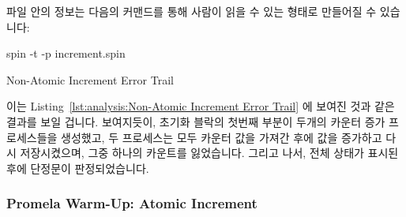  파일 안의 정보는 다음의 커맨드를 통해 사람이 읽을 수 있는 형태로
만들어질 수 있습니다:
\iffalse

This will produce output as shown in
Listing~\ref{lst:formal:Non-Atomic Increment Spin Output}.
The first line tells us that our assertion was violated (as expected
given the non-atomic increment!).
The second line tells us that a \co{trail} file was written describing how the
assertion was violated.
The ``Warning'' line reiterates that all was not well with our model.
The second paragraph describes the type of state-search being carried out,
in this case for assertion violations and invalid end states.
The third paragraph gives state-size statistics: this small model had only
45 states.
The final line shows memory usage.

The \co{trail} file may be rendered human-readable as follows:
\fi

\begin{VerbatimU}
spin -t -p increment.spin
\end{VerbatimU}

\begin{listing*}[htbp]
\vspace*{-9pt}
\caption{Non-Atomic Increment Error Trail}
\label{lst:formal:Non-Atomic Increment Error Trail}
\end{listing*}

이는
Listing~\ref{lst:analysis:Non-Atomic Increment Error Trail}
에 보여진 것과 같은 결과를 보일 겁니다.
보여지듯이, 초기화 블락의 첫번째 부분이 두개의 카운터 증가 프로세스들을
생성했고, 두 프로세스는 모두 카운터 값을 가져간 후에 값을 증가하고 다시
저장시켰으며, 그중 하나의 카운트를 잃었습니다.
그리고 나서, 전체 상태가 표시된 후에 단정문이 판정되었습니다.
\iffalse

This gives the output shown in
Listing~\ref{lst:formal:Non-Atomic Increment Error Trail}.
As can be seen, the first portion of the init block created both
incrementer processes, both of which first fetched the counter,
then both incremented and stored it, losing a count.
The assertion then triggered, after which the global state is displayed.
\fi

\subsubsection{Promela Warm-Up: Atomic Increment}
\label{sec:formal:Promela Warm-Up: Atomic Increment}

